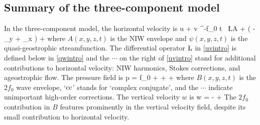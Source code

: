\documentclass[12pt, oneside]{book}
\begin{document}
\subsection{Summary of the three-component model}

In the three-component model, the horizontal velocity is 
\beq
u + \ii v  \ee^{-\ii f_0 t} \, \L A + \left ( - \p_y + \ii \p_x \right ) \psi + \cdots \per
\label{uvintro}
\eeq
where $A(x,y,z,t)$ is the NIW envelope and $\psi(x,y,z,t)$ is the quasi-geostrophic streamfunction.    The differential operator $\mathrm{L}$ in \eqref{uvintro} is defined below in \eqref{qwintro} and the $\cdots$ on the right of \eqref{uvintro} stand for additional contributions to horizontal velocity: NIW  harmonics, Stokes corrections, and ageostrophic flow.  The pressure field is 
\beq
p = f_0 \psi  +  \Big [ \ee^{-\ii f_0 t} (\p_x - \ii \p_y ) A + \ee^{-2 \ii f_0 t} 2 B \Big ]  + \cc + \cdots \com
\label{pintro}
\eeq
where $B(x,y,z,t)$ is the $2f_0$ wave envelope, `$\mathrm{cc}$' stands for `complex conjugate', and the $\cdots$ indicate unimportant high-order corrections.  The vertical velocity $w$ is
\beq
w = -  \Big [ \ee^{-\ii f_0 t} (\p_x - \ii \p_y ) A_z + \ee^{-2 \ii f_0 t} 4 B_z \Big ] + \cc \per
\eeq
The $2f_0$ contribution in $B$ features prominently in the vertical velocity field, despite its small contribution to horizontal velocity.
\end{document}
